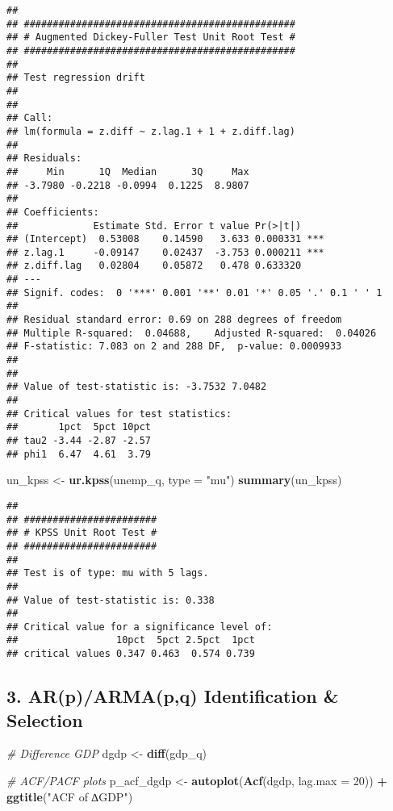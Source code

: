\documentclass[
]{article}
\newenvironment{Shaded}{\begin{snugshade}}{\end{snugshade}}
\newcommand{\AttributeTok}[1]{\textcolor[rgb]{0.13,0.29,0.53}{#1}}
\newcommand{\CommentTok}[1]{\textcolor[rgb]{0.56,0.35,0.01}{\textit{#1}}}
\newcommand{\DecValTok}[1]{\textcolor[rgb]{0.00,0.00,0.81}{#1}}
\newcommand{\FunctionTok}[1]{\textcolor[rgb]{0.13,0.29,0.53}{\textbf{#1}}}
\newcommand{\NormalTok}[1]{#1}
\newcommand{\OtherTok}[1]{\textcolor[rgb]{0.56,0.35,0.01}{#1}}
\newcommand{\SpecialCharTok}[1]{\textcolor[rgb]{0.81,0.36,0.00}{\textbf{#1}}}
\newcommand{\StringTok}[1]{\textcolor[rgb]{0.31,0.60,0.02}{#1}}
\begin{document}
\begin{verbatim}
## 
## ############################################### 
## # Augmented Dickey-Fuller Test Unit Root Test # 
## ############################################### 
## 
## Test regression drift 
## 
## 
## Call:
## lm(formula = z.diff ~ z.lag.1 + 1 + z.diff.lag)
## 
## Residuals:
##     Min      1Q  Median      3Q     Max 
## -3.7980 -0.2218 -0.0994  0.1225  8.9807 
## 
## Coefficients:
##             Estimate Std. Error t value Pr(>|t|)    
## (Intercept)  0.53008    0.14590   3.633 0.000331 ***
## z.lag.1     -0.09147    0.02437  -3.753 0.000211 ***
## z.diff.lag   0.02804    0.05872   0.478 0.633320    
## ---
## Signif. codes:  0 '***' 0.001 '**' 0.01 '*' 0.05 '.' 0.1 ' ' 1
## 
## Residual standard error: 0.69 on 288 degrees of freedom
## Multiple R-squared:  0.04688,    Adjusted R-squared:  0.04026 
## F-statistic: 7.083 on 2 and 288 DF,  p-value: 0.0009933
## 
## 
## Value of test-statistic is: -3.7532 7.0482 
## 
## Critical values for test statistics: 
##       1pct  5pct 10pct
## tau2 -3.44 -2.87 -2.57
## phi1  6.47  4.61  3.79
\end{verbatim}

\begin{Shaded}
\begin{Highlighting}[]
\NormalTok{un\_kpss  }\OtherTok{\textless{}{-}} \FunctionTok{ur.kpss}\NormalTok{(unemp\_q, }\AttributeTok{type =} \StringTok{"mu"}\NormalTok{)}
\FunctionTok{summary}\NormalTok{(un\_kpss)}
\end{Highlighting}
\end{Shaded}

\begin{verbatim}
## 
## ####################### 
## # KPSS Unit Root Test # 
## ####################### 
## 
## Test is of type: mu with 5 lags. 
## 
## Value of test-statistic is: 0.338 
## 
## Critical value for a significance level of: 
##                 10pct  5pct 2.5pct  1pct
## critical values 0.347 0.463  0.574 0.739
\end{verbatim}

\hypertarget{arparmapq-identification-selection}{%
\subsection{3. AR(p)/ARMA(p,q) Identification \&
Selection}\label{arparmapq-identification-selection}}

\begin{Shaded}
\begin{Highlighting}[]
\CommentTok{\# Difference GDP}
\NormalTok{dgdp }\OtherTok{\textless{}{-}} \FunctionTok{diff}\NormalTok{(gdp\_q)}

\CommentTok{\# ACF/PACF plots}
\NormalTok{p\_acf\_dgdp }\OtherTok{\textless{}{-}} \FunctionTok{autoplot}\NormalTok{(}\FunctionTok{Acf}\NormalTok{(dgdp,  }\AttributeTok{lag.max =} \DecValTok{20}\NormalTok{)) }\SpecialCharTok{+} \FunctionTok{ggtitle}\NormalTok{(}\StringTok{"ACF of ∆GDP"}\NormalTok{)}
\end{Highlighting}
\end{Shaded}
\end{document}
